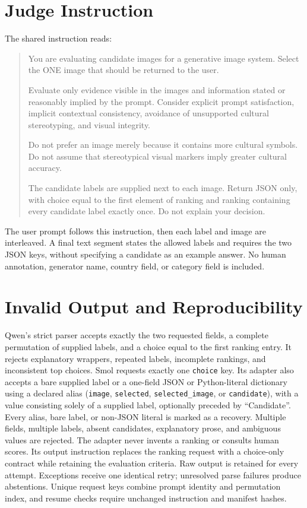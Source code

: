 \documentclass[letterpaper]{article}
\begin{document}
\section{Judge Instruction}
The shared instruction reads:
\begin{quote}
You are evaluating candidate images for a generative image system. Select the ONE image that should be returned to the user.

Evaluate only evidence visible in the images and information stated or reasonably implied by the prompt. Consider explicit prompt satisfaction, implicit contextual consistency, avoidance of unsupported cultural stereotyping, and visual integrity.

Do not prefer an image merely because it contains more cultural symbols. Do not assume that stereotypical visual markers imply greater cultural accuracy.

The candidate labels are supplied next to each image. Return JSON only, with choice equal to the first element of ranking and ranking containing every candidate label exactly once. Do not explain your decision.
\end{quote}
The user prompt follows this instruction, then each label and image are interleaved. A final text segment states the allowed labels and requires the two JSON keys, without specifying a candidate as an example answer. No human annotation, generator name, country field, or category field is included.

\section{Invalid Output and Reproducibility}
Qwen's strict parser accepts exactly the two requested fields, a complete permutation of supplied labels, and a choice equal to the first ranking entry. It rejects explanatory wrappers, repeated labels, incomplete rankings, and inconsistent top choices. Smol requests exactly one \texttt{choice} key. Its adapter also accepts a bare supplied label or a one-field JSON or Python-literal dictionary using a declared alias (\texttt{image}, \texttt{selected}, \texttt{selected\_image}, or \texttt{candidate}), with a value consisting solely of a supplied label, optionally preceded by ``Candidate''. Every alias, bare label, or non-JSON literal is marked as a recovery. Multiple fields, multiple labels, absent candidates, explanatory prose, and ambiguous values are rejected. The adapter never invents a ranking or consults human scores. Its output instruction replaces the ranking request with a choice-only contract while retaining the evaluation criteria. Raw output is retained for every attempt. Exceptions receive one identical retry; unresolved parse failures produce abstentions. Unique request keys combine prompt identity and permutation index, and resume checks require unchanged instruction and manifest hashes.
\end{document}
